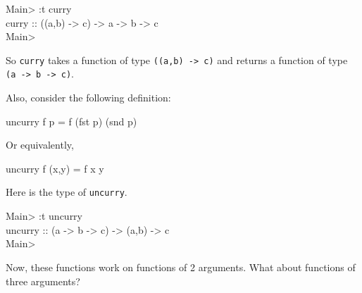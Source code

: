 \documentclass[11pt]{article}
\begin{document}
\begin{program*}
  \> Main> :t curry \\
  \> curry :: ((a,b) -> c) -> a -> b -> c \\
  \> Main>  \\
\end{program*}
So {\tt{curry}} takes a function of type {\tt{((a,b) -> c)}} and returns a function of type {\tt{(a -> b -> c)}}.

Also, consider the following definition: %

\begin{program*}
\> uncurry f p =  f (fst p) (snd p)    \\
\end{program*}

Or equivalently, 

\begin{program*}
\> uncurry f (x,y) =  f x y    \\
\end{program*}

Here is the type of {\tt{uncurry}}.

\begin{program*}
\> Main> :t uncurry \\ 
\> uncurry :: (a -> b -> c) -> (a,b) -> c \\ 
\> Main>  \\ 
\end{program*}


Now, these functions work on functions of 2 arguments.  What about functions of three arguments?


\end{document}

